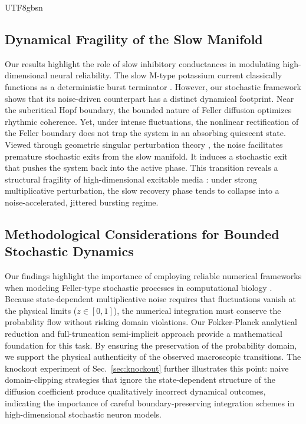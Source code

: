 ﻿\documentclass[reprint, amsmath, amssymb, aps, pre]{revtex4-2}
\begin{document}
\begin{CJK*}{UTF8}{gbsn}
\subsection{Dynamical Fragility of the Slow Manifold}
Our results highlight the role of slow inhibitory conductances in modulating high-dimensional neural reliability. The slow M-type potassium current classically functions as a deterministic burst terminator \cite{gutkin1998dynamics, golomb2006contribution}. However, our stochastic framework shows that its noise-driven counterpart has a distinct dynamical footprint. Near the subcritical Hopf boundary, the bounded nature of Feller diffusion optimizes rhythmic coherence. Yet, under intense fluctuations, the nonlinear rectification of the Feller boundary does not trap the system in an absorbing quiescent state. Viewed through geometric singular perturbation theory \cite{wechselberger2020geometric}, the noise facilitates premature stochastic exits from the slow manifold. It induces a stochastic exit \cite{berglund2006noise} that pushes the system back into the active phase. This transition reveals a structural fragility of high-dimensional excitable media \cite{lindner2004effects}: under strong multiplicative perturbation, the slow recovery phase tends to collapse into a noise-accelerated, jittered bursting regime.

\subsection{Methodological Considerations for Bounded Stochastic Dynamics}
Our findings highlight the importance of employing reliable numerical frameworks when modeling Feller-type stochastic processes in computational biology \cite{faisal2008noise, goldwyn2011what}. Because state-dependent multiplicative noise requires that fluctuations vanish at the physical limits ($z \in [0, 1]$), the numerical integration must conserve the probability flow without risking domain violations. Our Fokker-Planck analytical reduction \cite{gardiner2009stochastic} and full-truncation semi-implicit approach \cite{higham2005convergence, lord2010comparison} provide a mathematical foundation for this task. By ensuring the preservation of the probability domain, we support the physical authenticity of the observed macroscopic transitions. The knockout experiment of Sec.~\ref{sec:knockout} further illustrates this point: naive domain-clipping strategies that ignore the state-dependent structure of the diffusion coefficient produce qualitatively incorrect dynamical outcomes, indicating the importance of careful boundary-preserving integration schemes in high-dimensional stochastic neuron models.


\end{CJK*}
\end{document}
